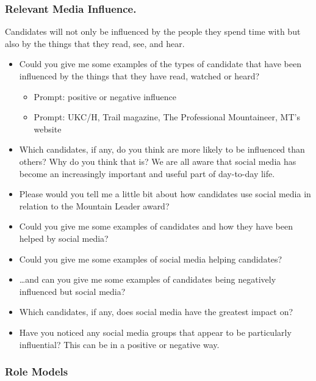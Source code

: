 \documentclass[
  12pt,
  a4paper,
]{book}
\providecommand{\tightlist}{%
  \setlength{\itemsep}{0pt}\setlength{\parskip}{0pt}}
\begin{document}
\hypertarget{relevant-media-influence.}{%
\subsubsection{Relevant Media Influence.}\label{relevant-media-influence.}}

Candidates will not only be influenced by the people they spend time with but also by the things that they read, see, and hear.

\begin{itemize}
\tightlist
\item
  Could you give me some examples of the types of candidate that have been influenced by the things that they have read, watched or heard?

  \begin{itemize}
  \tightlist
  \item
    Prompt: positive or negative influence
  \item
    Prompt: UKC/H, Trail magazine, The Professional Mountaineer, MT's website
  \end{itemize}
\item
  Which candidates, if any, do you think are more likely to be influenced than others? Why do you think that is?
  We are all aware that social media has become an increasingly important and useful part of day-to-day life.
\item
  Please would you tell me a little bit about how candidates use social media in relation to the Mountain Leader award?
\item
  Could you give me some examples of candidates and how they have been helped by social media?
\item
  Could you give me some examples of social media helping candidates?
\item
  \ldots and can you give me some examples of candidates being negatively influenced but social media?
\item
  Which candidates, if any, does social media have the greatest impact on?
\item
  Have you noticed any social media groups that appear to be particularly influential? This can be in a positive or negative way.
\end{itemize}

\hypertarget{role-models}{%
\subsubsection{Role Models}\label{role-models}}
\end{document}
